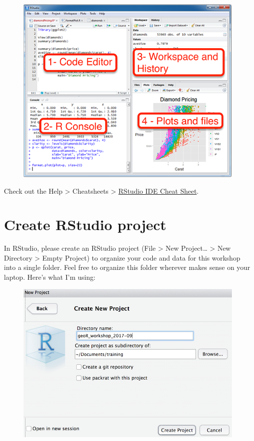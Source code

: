 \documentclass[]{book}
\theoremstyle{definition}
\theoremstyle{definition}
\theoremstyle{definition}
\theoremstyle{remark}
\begin{document}
\begin{figure}[htbp]
\centering
\includegraphics{figs/rstudio.png}
\caption{}
\end{figure}

Check out the Help \textgreater{} Cheatsheets \textgreater{}
\href{https://github.com/rstudio/cheatsheets/raw/master/rstudio-ide.pdf}{RStudio
IDE Cheat Sheet}.

\section{Create RStudio project}\label{create-rstudio-project}

In RStudio, please create an RStudio project (File \textgreater{} New
Project\ldots{} \textgreater{} New Directory \textgreater{} Empty
Project) to organize your code and data for this workshop into a single
folder. Feel free to organize this folder wherever makes sense on your
laptop. Here's what I'm using:

\begin{figure}[htbp]
\centering
\includegraphics{figs/rstudio-new-project.png}
\caption{}
\end{figure}
\end{document}
